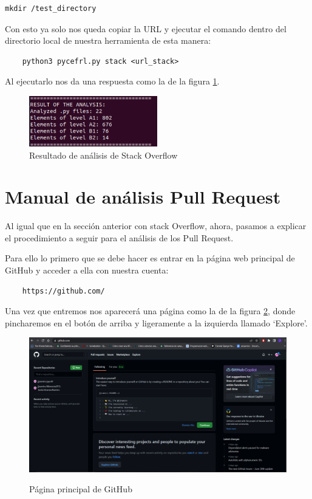 \documentclass[a4paper, 12pt]{book}
\begin{document}
\begin{verbatim}
mkdir /test_directory
\end{verbatim}

Con esto ya solo nos queda copiar la URL y ejecutar el comando dentro del directorio local de nuestra herramienta de esta manera:

\begin{verbatim}
	python3 pycefrl.py stack <url_stack>
\end{verbatim}

Al ejecutarlo nos da una respuesta como la de la figura \ref{figura:stack4}.

\begin{figure}
	\centering
    \includegraphics[width=0.5\textwidth]{img/stack4}
    \caption{Resultado de análisis de Stack Overflow}
    \label{figura:stack4}
\end{figure}

\section{Manual de análisis Pull Request}

Al igual que en la sección anterior con stack Overflow, ahora, pasamos a explicar el procedimiento a seguir para el análisis de los Pull Request.

Para ello lo primero que se debe hacer es entrar en la página web principal de GitHub y acceder a ella con nuestra cuenta:

\begin{verbatim}
	https://github.com/
\end{verbatim}

Una vez que entremos nos aparecerá una página como la de la figura \ref{figura:git1}, donde pincharemos en el botón de arriba y ligeramente a la izquierda llamado `Explore'.

\begin{figure}
    \includegraphics[bb=0 0 800 600, width=12cm, keepaspectratio]{img/git1}
    \label{figura:git1}
    \caption{Página principal de GitHub}
 \end{figure}
 
\end{document}
